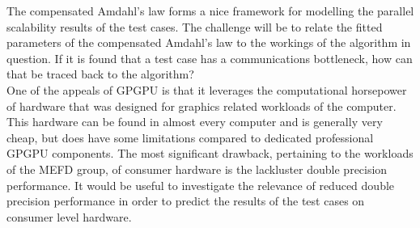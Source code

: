 The compensated Amdahl's law forms a nice framework for modelling the parallel scalability results of the test cases. The challenge will be to relate the fitted parameters of the compensated Amdahl's law to the workings of the algorithm in question. If it is found that a test case has a communications bottleneck, how can that be traced back to the algorithm?\\

One of the appeals of GPGPU is that it leverages the computational horsepower of hardware that was designed for graphics related workloads of the computer. This hardware can be found in almost every computer and is generally very cheap, but does have some limitations compared to dedicated professional GPGPU components. The most significant drawback, pertaining to the workloads of the MEFD group, of consumer hardware is the lackluster double precision performance. It would be useful to investigate the relevance of reduced double precision performance in order to predict the results of the test cases on consumer level hardware.